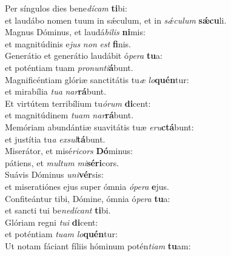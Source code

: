\evenverse Per síngulos dies bene\textit{dí}\textit{cam} \textbf{ti}bi:~\*\\
\evenverse et laudábo nomen tuum in sǽculum, et in \textit{sǽ}\textit{cu}\textit{lum} \textbf{sǽ}\textbf{cu}li.\\
\oddverse Magnus Dóminus, et laudá\textit{bi}\textit{lis} \textbf{ni}mis:~\*\\
\oddverse et magnitúdinis e\textit{jus} \textit{non} \textit{est} \textbf{fi}nis.\\
\evenverse Generátio et generátio laudábit ó\textit{pe}\textit{ra} \textbf{tu}a:~\*\\
\evenverse et poténtiam tuam \textit{pro}\textit{nun}\textit{ti}\textbf{á}bunt.\\
\oddverse Magnificéntiam glóriæ sanctitátis tu\textit{æ} \textit{lo}\textbf{quén}tur:~\*\\
\oddverse et mirabília \textit{tu}\textit{a} \textit{nar}\textbf{rá}bunt.\\
\evenverse Et virtútem terribílium tu\textit{ó}\textit{rum} \textbf{di}cent:~\*\\
\evenverse et magnitúdinem \textit{tu}\textit{am} \textit{nar}\textbf{rá}bunt.\\
\oddverse Memóriam abundántiæ suavitátis tuæ \textit{e}\textit{ru}\textbf{ctá}bunt:~\*\\
\oddverse et justítia tu\textit{a} \textit{ex}\textit{sul}\textbf{tá}bunt.\\
\evenverse Miserátor, et misé\textit{ri}\textit{cors} \textbf{Dó}minus:~\*\\
\evenverse pátiens, et \textit{mul}\textit{tum} \textit{mi}\textbf{sé}\textbf{ri}cors.\\
\oddverse Suávis Dóminus \textit{u}\textit{ni}\textbf{vér}sis:~\*\\
\oddverse et miseratiónes ejus super ómnia \textit{ó}\textit{pe}\textit{ra} \textbf{e}jus.\\
\evenverse Confiteántur tibi, Dómine, ómnia ó\textit{pe}\textit{ra} \textbf{tu}a:~\*\\
\evenverse et sancti tui be\textit{ne}\textit{dí}\textit{cant} \textbf{ti}bi.\\
\oddverse Glóriam regni \textit{tu}\textit{i} \textbf{di}cent:~\*\\
\oddverse et poténtiam \textit{tu}\textit{am} \textit{lo}\textbf{quén}tur:\\
\evenverse Ut notam fáciant fíliis hóminum potén\textit{ti}\textit{am} \textbf{tu}am:~\*\\
